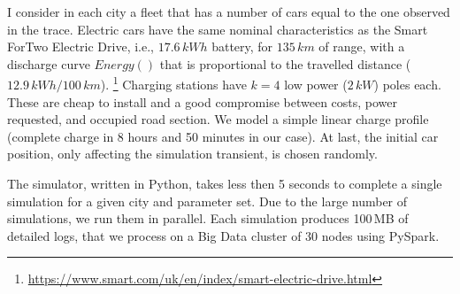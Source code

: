 I consider in each city a fleet that has a number of cars equal to the one observed in the trace. Electric cars have the same nominal characteristics as the Smart ForTwo Electric Drive, i.e., $17.6\,kWh$ battery, for $135\,km$ of range, with a discharge curve $Energy()$ that is proportional to the travelled distance ($12.9\,kWh/100\,km$). \footnote{\url{https://www.smart.com/uk/en/index/smart-electric-drive.html}} 
Charging stations have $k=4$ low power ($2\,kW$) poles each. These are cheap to install and a good compromise between costs, power requested, and occupied road section. We model a simple linear charge profile (complete charge in 8 hours and 50 minutes in our case). At last, the initial car position, only affecting the simulation transient, is chosen randomly.

The simulator, written in Python, takes less then 5 seconds to complete a single simulation for a given city and parameter set. 
Due to the large number of simulations, we run them in parallel. Each simulation produces 100\,MB of detailed logs, that we process on a Big Data cluster of 30 nodes using PySpark.%